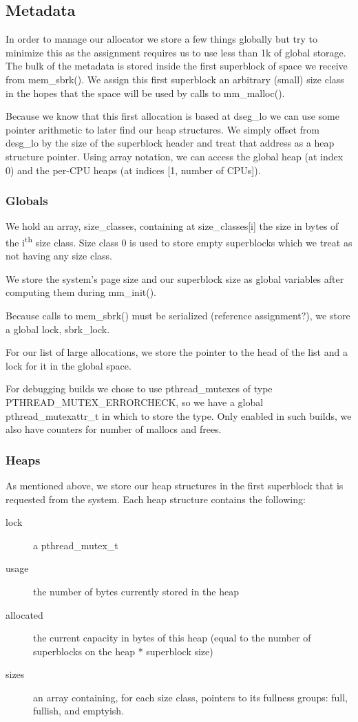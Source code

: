 \documentclass{article}
\begin{document}
\subsection{Metadata}
In order to manage our allocator we store a few things globally but try to
minimize this as the assignment requires us to use less than 1k of global
storage. The bulk of the metadata is stored inside the first superblock
of space we receive from mem\_sbrk(). We assign this first superblock an
arbitrary (small) size class in the hopes that the space will be used by
calls to mm\_malloc().

Because we know that this first allocation is based at dseg\_lo we can use
some pointer arithmetic to later find our heap structures. We simply offset
from desg\_lo by the size of the superblock header and treat that address as
a heap structure pointer. Using array notation, we can access the global
heap (at index 0) and the per-CPU heaps (at indices [1, number of CPUs]).

\subsubsection{Globals}
We hold an array, size\_classes, containing at size\_classes[i] the size
in bytes of the i\textsuperscript{th} size class. Size class 0 is used to
store empty superblocks which we treat as not having any size class.

We store the system's page size and our superblock size as global variables
after computing them during mm\_init().

Because calls to mem\_sbrk() must be serialized (reference assignment?), we
store a global lock, sbrk\_lock.

For our list of large allocations, we store the pointer to the head of the
list and a lock for it in the global space.

For debugging builds we chose to use pthread\_mutexes of type
PTHREAD\_MUTEX\_ERRORCHECK, so we have a global pthread\_mutexattr\_t in which
to store the type. Only enabled in such builds, we also have counters for
number of mallocs and frees.

\subsubsection{Heaps}
As mentioned above, we store our heap structures in the first superblock
that is requested from the system. Each heap structure contains the following:
\begin{description}
    \item[lock] a pthread\_mutex\_t
    \item[usage] the number of bytes currently stored in the heap
    \item[allocated] the current capacity in bytes of this heap
        (equal to the number of superblocks on the heap * superblock size)
    \item[sizes] an array containing, for each size class, pointers to
        its fullness groups: full, fullish, and emptyish.
\end{description}
\end{document}
